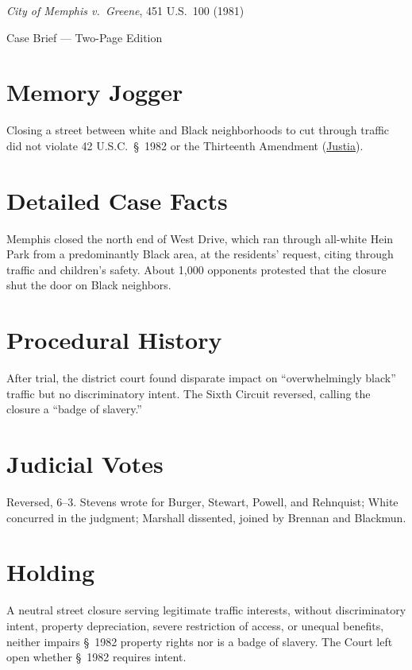 \documentclass[12pt]{article}
\begin{document}
\begin{center}
{\LARGE \textit{City of Memphis v.\ Greene}, 451 U.S.\ 100 (1981)\par}
\vspace{0.5em}
{\large Case Brief --- Two-Page Edition\par}
\end{center}

\section{Memory Jogger}
Closing a street between white and Black neighborhoods to cut through traffic did not violate 42 U.S.C.\ \S~1982 or the Thirteenth Amendment (\href{https://supreme.justia.com/cases/federal/us/451/100/}{Justia}).

\section{Detailed Case Facts}
Memphis closed the north end of West Drive, which ran through all-white Hein Park from a predominantly Black area, at the residents' request, citing through traffic and children's safety. About 1,000 opponents protested that the closure shut the door on Black neighbors.

\section{Procedural History}
After trial, the district court found disparate impact on ``overwhelmingly black'' traffic but no discriminatory intent. The Sixth Circuit reversed, calling the closure a ``badge of slavery.''

\section{Judicial Votes}
Reversed, 6--3. Stevens wrote for Burger, Stewart, Powell, and Rehnquist; White concurred in the judgment; Marshall dissented, joined by Brennan and Blackmun.

\section{Holding}
A neutral street closure serving legitimate traffic interests, without discriminatory intent, property depreciation, severe restriction of access, or unequal benefits, neither impairs \S~1982 property rights nor is a badge of slavery. The Court left open whether \S~1982 requires intent.
\end{document}
